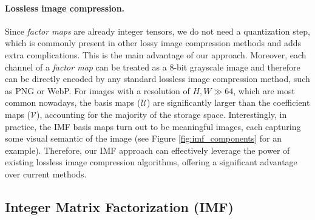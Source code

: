 \paragraph{Lossless image compression.}
Since \emph{factor maps} are already integer tensors, we do not need a quantization step, which is commonly present in other lossy image compression methods and adds extra complications. This is the main advantage of our approach. Moreover, each channel of a \emph{factor map} can be treated as a 8-bit grayscale image and therefore can be directly encoded by any standard lossless image compression method, such as PNG or WebP. For images with a resolution of $H, W \gg 64$, which are most common nowadays, the basis maps ($\bm{\mathcal{U}}$) are significantly larger than the coefficient maps ($\bm{\mathcal{V}}$), accounting for the majority of the storage space. Interestingly, in practice, the IMF basis maps turn out to be meaningful images, each capturing some visual semantic of the image (see Figure \ref{fig:imf_components} for an example). Therefore, our IMF approach can effectively leverage the power of existing lossless image compression algorithms, offering a significant advantage over current methods.


\subsection{Integer Matrix Factorization (IMF)} \label{sec: imf}

